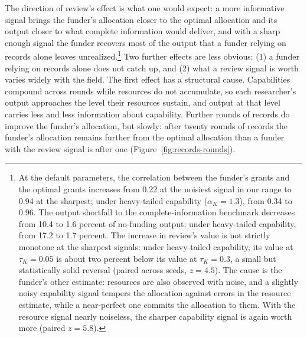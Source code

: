\documentclass[article, 11pt, reqno]{amsart}
\theoremstyle{named}
\begin{document}
The direction of review's effect is what one would expect: a more informative signal
brings the funder's allocation closer to the optimal allocation and its output closer
to what complete information would deliver, and with a sharp enough signal the funder
recovers most of the output that a funder relying on records alone leaves
unrealized.\footnote{At the default parameters, the correlation between the funder's
grants and the optimal grants increases from 0.22 at the noisiest signal in our range
to 0.94 at the sharpest; under heavy-tailed capability ($\alpha_K = 1.3$), from 0.34 to
0.96. The output shortfall to the complete-information benchmark decreases from 10.4 to
1.6 percent of no-funding output; under heavy-tailed capability, from 17.2 to 1.7
percent. The increase in review's value is not strictly monotone at the sharpest
signals: under heavy-tailed capability, its value at $\tau_K = 0.05$ is about two
percent below its value at $\tau_K = 0.3$, a small but statistically solid reversal
(paired across seeds, $z = 4.5$). The cause is the funder's other estimate: resources
are also observed with noise, and a slightly noisy capability signal tempers the
allocation against errors in the resource estimate, while a near-perfect one commits
the allocation to them. With the resource signal nearly noiseless, the sharper
capability signal is again worth more (paired $z = 5.8$).} Two further effects are less
obvious: (1) a funder relying on records alone does not catch up, and (2) what a review
signal is worth varies widely with the field. The first effect has a structural cause.
Capabilities compound across rounds while resources do not accumulate, so each
researcher's output approaches the level their resources sustain, and output at that
level carries less and less information about capability. Further rounds of records do
improve the funder's allocation, but slowly: after twenty rounds of records the
funder's allocation remains further from the optimal allocation than a funder with the
review signal is after one (Figure~\ref{fig:records-rounds}).


\end{document}
